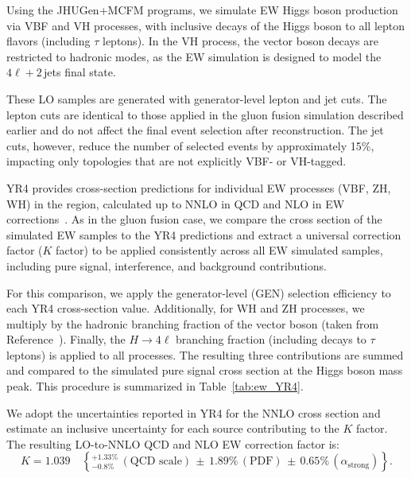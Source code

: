 Using the JHUGen+MCFM programs, we simulate EW Higgs boson production via VBF and VH processes, with inclusive decays of the Higgs boson to all lepton flavors (including $\tau$ leptons). In the VH process, the vector boson decays are restricted to hadronic modes, as the EW simulation is designed to model the $4\ell + 2$\,jets final state.

These LO samples are generated with generator-level lepton and jet cuts. The lepton cuts are identical to those applied in the gluon fusion simulation described earlier and do not affect the final event selection after reconstruction. The jet cuts, however, reduce the number of selected events by approximately 15\%, impacting only topologies that are not explicitly VBF- or VH-tagged.

YR4 provides cross-section predictions for individual EW processes (VBF, ZH, WH) in the \onshell region, calculated up to NNLO in QCD and NLO in EW corrections~\cite{YellowRep4}. As in the gluon fusion case, we compare the \onshell cross section of the simulated EW samples to the YR4 predictions and extract a universal correction factor ($K$ factor) to be applied consistently across all EW simulated samples, including pure signal, interference, and background contributions.

For this comparison, we apply the generator-level (GEN) selection efficiency to each YR4 cross-section value. Additionally, for WH and ZH processes, we multiply by the hadronic branching fraction of the vector boson (taken from Reference~\cite{Zyla:2020zbs}). Finally, the $H \to 4\ell$ branching fraction (including decays to $\tau$ leptons) is applied to all processes. The resulting three contributions are summed and compared to the simulated pure signal cross section at the Higgs boson mass peak. This procedure is summarized in Table~\ref{tab:ew_YR4}.

We adopt the uncertainties reported in YR4 for the NNLO cross section and estimate an inclusive uncertainty for each source contributing to the $K$ factor. The resulting LO-to-NNLO QCD and NLO EW correction factor is:
\[
K = \mathbf{1.039} \quad \left\{{}^{+1.33\%}_{-0.8\%} \,(\text{QCD scale}) \,\pm\, 1.89\% \,(\text{PDF}) \,\pm\, 0.65\%\, (\alpha_\text{strong}) \right\}.
\]

